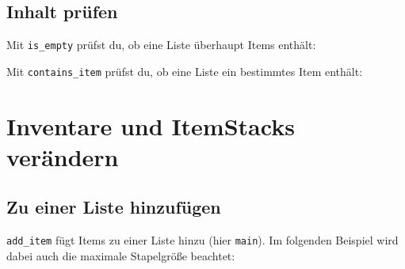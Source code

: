 \subsection{Inhalt prüfen}\label{inhalt-pruxfcfen}

Mit \texttt{is\_\allowbreak{}empty} prüfst du, ob eine Liste überhaupt
Items enthält:

\begin{Shaded}
\begin{Highlighting}[]
 \OperatorTok{:}\OperatorTok{(}\OperatorTok{)} 
    \OperatorTok{(}\OperatorTok{)}
\end{Highlighting}
\end{Shaded}

Mit \texttt{contains\_\allowbreak{}item} prüfst du, ob eine Liste ein
bestimmtes Item enthält:

\begin{Shaded}
\begin{Highlighting}[]
 \OperatorTok{:}\OperatorTok{(}\OperatorTok{,} \OperatorTok{)} 
    \OperatorTok{(}\OperatorTok{)}
\end{Highlighting}
\end{Shaded}

\section{Inventare und ItemStacks
verändern}\label{inventare-und-itemstacks-veruxe4ndern}

\subsection{Zu einer Liste
hinzufügen}\label{zu-einer-liste-hinzufuxfcgen}

\texttt{add\_\allowbreak{}item} fügt Items zu einer Liste hinzu (hier
\texttt{\textquotedbl{}main\textquotedbl{}}). Im folgenden Beispiel wird
dabei auch die maximale Stapelgröße beachtet:

